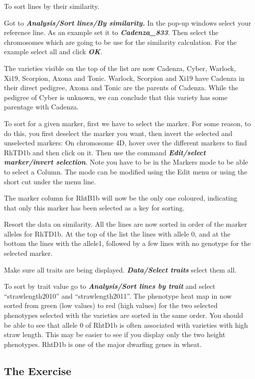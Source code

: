 \documentclass[
]{book}
\begin{document}
To sort lines by their similarity.

Got to \textbf{\emph{Analysis/Sort lines/By similarity.}} In the pop-up windows select your reference line. As an example set it to \textbf{\emph{Cadenza\_833}}. Then select the chromosomes which are going to be use for the similarity calculation. For the example select all and click \textbf{\emph{OK}}.

The varieties visible on the top of the list are now Cadenza, Cyber, Warlock, Xi19, Scorpion, Axona and Tonic. Warlock, Scorpion and Xi19 have Cadenza in their direct pedigree, Axona and Tonic are the parents of Cadenza. While the pedigree of Cyber is unknown, we can conclude that this variety has some parentage with Cadenza.

To sort for a given marker, first we have to select the marker. For some reason, to do this, you first deselect the marker you want, then invert the selected and unselected markers: On chromosome 4D, hover over the different markers to find RhTD1b and then click on it. Then use the command \textbf{\emph{Edit/select marker/invert selection}}. Note you have to be in the Markers mode to be able to select a Column. The mode can be modified using the Edit menu or using the short cut under the menu line.

The marker column for RhtB1b will now be the only one coloured, indicating that only this marker has been selected as a key for sorting.

Resort the data on similarity. All the lines are now sorted in order of the marker alleles for RhTD1b. At the top of the list the lines with allele 0, and at the bottom the lines with the allele1, followed by a few lines with no genotype for the selected marker.

Make sure all traits are being displayed. \textbf{\emph{Data/Select traits}} select them all.

To sort by trait value go to \textbf{\emph{Analysis/Sort lines by trait}} and select ``strawlength2010'' and ``strawlength2011''. The phenotype heat map in now sorted from green (low values) to red (high values) for the two selected phenotypes selected with the varieties are sorted in the same order. You should be able to see that allele 0 of RhtD1b is often associated with varieties with high straw length. This may be easier to see if you display only the two height phenotypes. RhtD1b is one of the major dwarfing genes in wheat.

\hypertarget{the-exercise-3}{%
\subsection{The Exercise}\label{the-exercise-3}}
\end{document}
